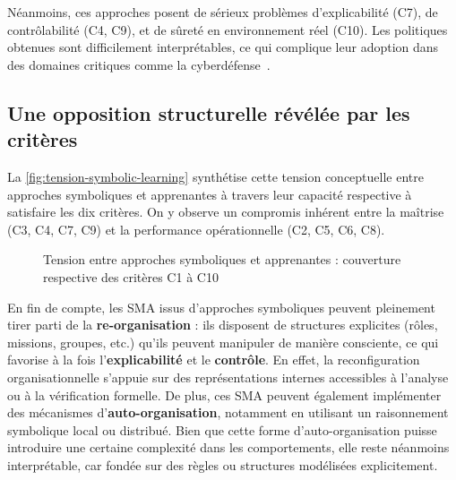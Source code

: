 Néanmoins, ces approches posent de sérieux problèmes d'explicabilité (C7), de contrôlabilité (C4, C9), et de sûreté en environnement réel (C10). Les politiques obtenues sont difficilement interprétables, ce qui complique leur adoption dans des domaines critiques comme la cyberdéfense~\cite{Gunning2019}.

\subsection{Une opposition structurelle révélée par les critères}

La \autoref{fig:tension-symbolic-learning} synthétise cette tension conceptuelle entre approches symboliques et apprenantes à travers leur capacité respective à satisfaire les dix critères. On y observe un compromis inhérent entre la maîtrise (C3, C4, C7, C9) et la performance opérationnelle (C2, C5, C6, C8).

\begin{figure}[H]
    \centering
    \resizebox{\textwidth}{!}{%
        
    }
    \caption{Tension entre approches symboliques et apprenantes : couverture respective des critères C1 à C10}
    \label{fig:tension-symbolic-learning}
\end{figure}

En fin de compte, les \ac{SMA} issus d'approches symboliques peuvent pleinement tirer parti de la \textbf{re-organisation} : ils disposent de structures explicites (rôles, missions, groupes, etc.) qu'ils peuvent manipuler de manière consciente, ce qui favorise à la fois l'\textbf{explicabilité} et le \textbf{contrôle}. En effet, la reconfiguration organisationnelle s'appuie sur des représentations internes accessibles à l'analyse ou à la vérification formelle. De plus, ces \ac{SMA} peuvent également implémenter des mécanismes d'\textbf{auto-organisation}, notamment en utilisant un raisonnement symbolique local ou distribué. Bien que cette forme d'auto-organisation puisse introduire une certaine complexité dans les comportements, elle reste néanmoins interprétable, car fondée sur des règles ou structures modélisées explicitement.

